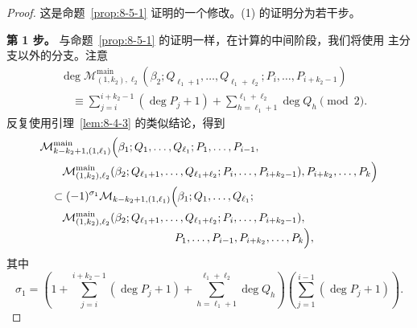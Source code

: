 \begin{proof}
这是命题~\ref{prop:8-5-1} 证明的一个修改。(1) 的证明分为若干步。

\par\smallskip\noindent\textbf{第 1 步。}
与命题~\ref{prop:8-5-1} 的证明一样，在计算的中间阶段，我们将使用
主分支以外的分支。注意
\[
\begin{aligned}
&\deg\mathcal M_{(1,k_2),\ell_2}^{\mathrm{main}}
(\beta_2;Q_{\ell_1+1},\ldots,Q_{\ell_1+\ell_2};
P_i,\ldots,P_{i+k_2-1})\\
&\quad\equiv
\sum_{j=i}^{i+k_2-1}(\deg P_j+1)
+\sum_{h=\ell_1+1}^{\ell_1+\ell_2}\deg Q_h
\pmod2.
\end{aligned}
\]
反复使用引理~\ref{lem:8-4-3} 的类似结论，得到
\[
\begin{aligned}
&\mathcal M_{k-k_2+1,(1,\ell_1)}^{\mathrm{main}}
\Bigl(\beta_1;Q_1,\ldots,Q_{\ell_1};P_1,\ldots,P_{i-1},\\
&\qquad
\mathcal M_{(1,k_2),\ell_2}^{\mathrm{main}}
(\beta_2;Q_{\ell_1+1},\ldots,Q_{\ell_1+\ell_2};
P_i,\ldots,P_{i+k_2-1}),P_{i+k_2},\ldots,P_k\Bigr)\\
&\quad\subset(-1)^{\sigma_1}
\mathcal M_{k-k_2+1,(1,\ell_1)}
\Bigl(\beta_1;Q_1,\ldots,Q_{\ell_1};\\
&\qquad
\mathcal M_{(1,k_2),\ell_2}^{\mathrm{main}}
(\beta_2;Q_{\ell_1+1},\ldots,Q_{\ell_1+\ell_2};
P_i,\ldots,P_{i+k_2-1}),\\[-2pt]
&\hspace{12em}P_1,\ldots,P_{i-1},P_{i+k_2},\ldots,P_k\Bigr),
\end{aligned}
\]
其中
\[
 \sigma_1=\left(
 1+\sum_{j=i}^{i+k_2-1}(\deg P_j+1)
 +\sum_{h=\ell_1+1}^{\ell_1+\ell_2}\deg Q_h\right)
 \left(\sum_{j=1}^{i-1}(\deg P_j+1)\right).
\]


\end{proof}
